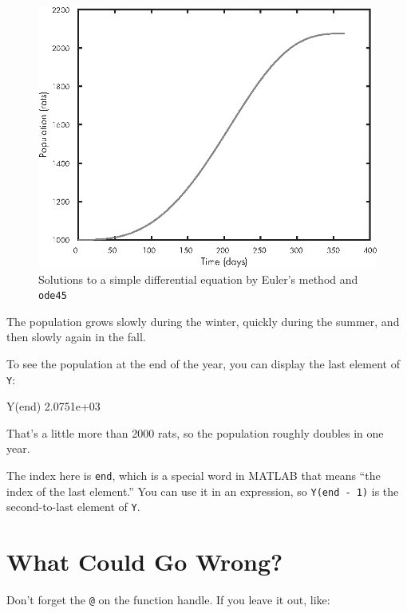 \begin{figure}[ht]
\centerline{\includegraphics[scale=0.8]{images/figure09_03_new.eps}}
\caption{Solutions to a simple differential equation by Euler's method and \lstinline{ode45}}
\label{fig:rats}
\end{figure}

The population grows slowly during the winter, quickly during the summer, and then slowly again in the fall.

To see the population at the end of the year, you can display the last element of \lstinline{Y}:

\begin{code}
Y(end)
2.0751e+03
\end{code}

That's a little more than 2000 rats, so the population roughly doubles in one year.

The index here is \lstinline{end}, which is a special word in MATLAB that means ``the index of the last element.''  You can use it in an expression, so \lstinline{Y(end - 1)} is the second-to-last element of
\lstinline{Y}.



\section{What Could Go Wrong?}

Don't forget the \lstinline{@} on the function handle.
If you leave it out, like:

